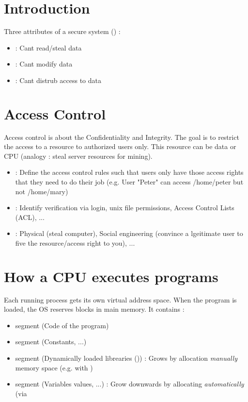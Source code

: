 \begingroup
\let\clearpage\relax
\chapter{Introduction}

Three attributes of a secure system () :
\begin{itemize}
    \item {} : Cant read/steal data
    \item {} : Cant modify data
    \item {} : Cant distrub access to data
\end{itemize}

\chapter{Access Control}

Access control is about the Confidentiality and Integrity. The goal is to restrict the access to a resource to authorized users only.
This resource can be data or CPU (analogy : steal server resources for mining).
\begin{itemize}
    \item {} : Define the access control rules such that users only have those access rights that they need to do their job (e.g. User "Peter" can access /home/peter but not /home/mary)
    \item {} : Identify verification via login, unix file permissions, Access Control Lists (ACL), ...
    \item {} : Physical (steal computer), Social engineering (convince a lgeitimate user to five the resource/access right to you), ...
\end{itemize}

\chapter{How a CPU executes programs}

Each running process gets its own virtual address space. When the program is loaded, the OS reserves blocks in main memory. It contains :
\begin{itemize}
    \item {} segment (Code of the program)
    \item {} segment (Constants, ...)
    \item {} segment (Dynamically loaded librearies ()) : Grows by allocation \textit{manually} memory space (e.g. with )
    \item {} segment (Variables values, ...) : Grow downwards by allocating \textit{automatically} (via 
\end{itemize}

